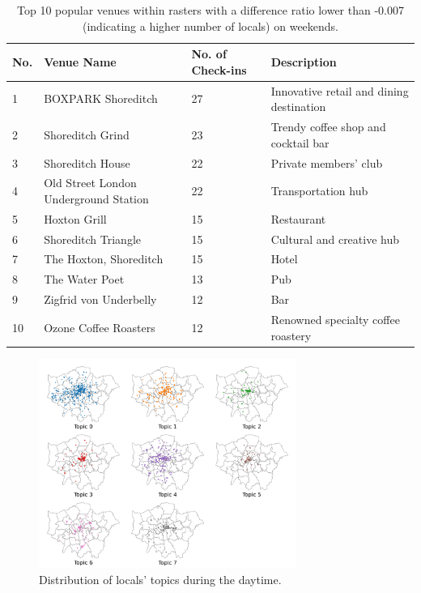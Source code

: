 \documentclass{article}
\theoremstyle{definition}
\theoremstyle{remark}
\begin{document}
\begin{table}[!h]
\centering
\caption{\label{tab:popular_venues_localspop_weekend}Top 10 popular venues within rasters with a difference ratio lower than -0.007 (indicating a higher number of locals) on weekends.}
\begin{adjustbox}{max width=\textwidth, margin=0cm}
\begin{threeparttable}
\begin{tabular}{lp{5cm}lp{4cm}} \hline
No. & Venue Name & No. of Check-ins & Description \\ \hline
1 & BOXPARK Shoreditch & 27 & Innovative retail and dining destination \\
2 & Shoreditch Grind & 23 & Trendy coffee shop and cocktail bar \\
3 & Shoreditch House & 22 & Private members' club \\
4 & Old Street London Underground Station & 22 & Transportation hub \\
5 & Hoxton Grill & 15 & Restaurant \\
6 & Shoreditch Triangle & 15 & Cultural and creative hub \\
7 & The Hoxton, Shoreditch & 15 & Hotel \\
8 & The Water Poet & 13 & Pub \\
9 & Zigfrid von Underbelly & 12 & Bar \\
10 & Ozone Coffee Roasters & 12 & Renowned specialty coffee roastery \\ \hline
\end{tabular}
\end{threeparttable}
\end{adjustbox}
\end{table}


\begin{figure}[!h]
\centering
\includegraphics[width=0.75\textwidth]{figures/topics_distribution_daytime_locals.png}
\caption{\label{fig:topics_distribution_daytime_locals}Distribution of locals' topics during the daytime.}
\end{figure}
\end{document}
